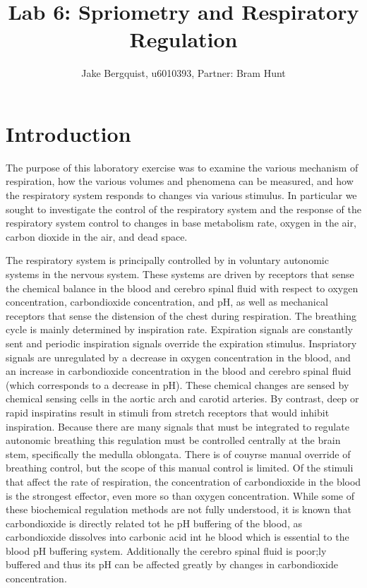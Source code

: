 \documentclass[12pt]{article}
\begin{document}
\title{Lab 6: Spriometry and Respiratory Regulation}
\author{Jake Bergquist, u6010393, Partner: Bram Hunt }
\maketitle

\section{Introduction}
The purpose of this laboratory exercise was to examine the various mechanism of respiration, how the various volumes and phenomena can be measured, and how the respiratory system responds to changes via various stimulus. In particular we sought to investigate the control of the respiratory system and the response of the respiratory system control to changes in base metabolism rate, oxygen in the air, carbon dioxide in the air, and dead space. 

The respiratory system is principally controlled by in voluntary autonomic systems in the nervous system. These systems are driven by receptors that sense the chemical balance in the blood and cerebro spinal fluid with respect to oxygen concentration, carbondioxide concentration, and pH, as well as mechanical receptors that sense the distension of the chest during respiration. The breathing cycle is mainly determined by inspiration rate. Expiration signals are constantly sent and periodic inspiration signals override the expiration stimulus. Inspriatory signals are unregulated by a decrease in oxygen concentration in the blood, and an increase in carbondioxide concentration in the blood and cerebro spinal fluid (which corresponds to a decrease in pH). These chemical changes are sensed by chemical sensing cells in the aortic arch and carotid arteries. By contrast, deep or rapid inspiratins result in stimuli from stretch receptors that would inhibit inspiration. Because there are many signals that must be integrated to regulate autonomic breathing this regulation must be controlled centrally at the brain stem, specifically the medulla oblongata. There is of couyrse manual override of breathing control, but the scope of this manual control is limited. Of the stimuli that affect the rate of respiration, the concentration of carbondioxide in the blood is the strongest effector, even more so than oxygen concentration. While some of these biochemical regulation methods are not fully understood, it is known that carbondioxide is directly related tot he pH buffering of the blood, as carbondioxide dissolves into carbonic acid int he blood which is essential to the blood pH buffering system. Additionally the cerebro spinal fluid is poor;ly buffered and thus its pH can be affected greatly by changes in carbondioxide concentration.
\end{document}
